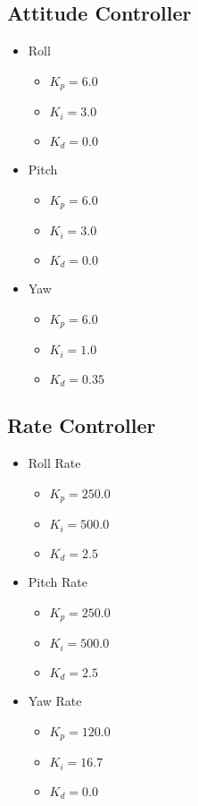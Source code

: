 \documentclass[10pt, a4paper]{article}
\begin{document}
    \begin{multicols}{2}
    \subsection{Attitude Controller}
        \begin{itemize}
            \item Roll
            \begin{itemize}
                \item $K_p = 6.0$
                \item $K_i = 3.0$
                \item $K_d = 0.0$
            \end{itemize}
            \item Pitch
            \begin{itemize}
                \item $K_p = 6.0$
                \item $K_i = 3.0$
                \item $K_d = 0.0$
            \end{itemize}
            \item Yaw
            \begin{itemize}
                \item $K_p = 6.0$
                \item $K_i = 1.0$
                \item $K_d = 0.35$
            \end{itemize}
        \end{itemize}
    \columnbreak
    
    \subsection{Rate Controller}
        \begin{itemize}
            \item Roll Rate
            \begin{itemize}
                \item $K_p = 250.0$
                \item $K_i = 500.0$
                \item $K_d = 2.5$
            \end{itemize}
            \item Pitch Rate
            \begin{itemize}
                \item $K_p = 250.0$
                \item $K_i = 500.0$
                \item $K_d = 2.5$
            \end{itemize}
            \item Yaw Rate
            \begin{itemize}
                \item $K_p = 120.0$
                \item $K_i = 16.7$
                \item $K_d = 0.0$
            \end{itemize}
        \end{itemize}
    \end{multicols}
\end{document}
